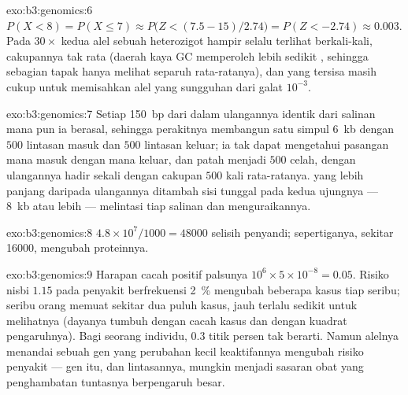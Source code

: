\begin{solution}{exo:b3:genomics:6}
$P(X < 8) = P(X \le 7) \approx P\bigl(Z < (7.5 - 15)/2.74\bigr) =
P(Z < -2.74) \approx 0.003$. Pada $30\times$ kedua alel sebuah
heterozigot hampir selalu terlihat berkali-kali, cakupannya tak rata
(daerah kaya GC memperoleh lebih sedikit , sehingga sebagian tapak
hanya melihat separuh rata-ratanya), dan  yang tersisa masih cukup untuk
memisahkan alel yang sungguhan dari galat $10^{-3}$.
\end{solution}

\begin{solution}{exo:b3:genomics:7}
Setiap  \qty{150}{bp} dari dalam ulangannya identik dari salinan mana
pun ia berasal, sehingga perakitnya membangun satu simpul \qty{6}{kb} dengan
$500$ lintasan masuk dan $500$ lintasan keluar; ia tak dapat mengetahui
pasangan mana masuk dengan mana keluar, dan  patah menjadi $500$
celah, dengan ulangannya hadir sekali dengan cakupan $500$ kali rata-ratanya.
 yang lebih panjang daripada ulangannya ditambah sisi tunggal pada
kedua ujungnya --- \qty{8}{kb} atau lebih --- melintasi tiap salinan dan
menguraikannya.
\end{solution}

\begin{solution}{exo:b3:genomics:8}
$4.8\times 10^{7}/1000 = \num{48000}$ selisih penyandi; sepertiganya,
sekitar \num{16000}, mengubah proteinnya.
\end{solution}

\begin{solution}{exo:b3:genomics:9}
Harapan cacah positif palsunya $10^{6}\times 5\times 10^{-8} = 0.05$. Risiko
nisbi $1.15$ pada penyakit berfrekuensi \qty{2}{\%} mengubah beberapa kasus
tiap seribu; seribu orang memuat sekitar dua puluh kasus, jauh terlalu sedikit
untuk melihatnya (dayanya tumbuh dengan cacah kasus dan dengan kuadrat
pengaruhnya). Bagi seorang individu, $0.3$ titik persen tak
berarti. Namun alelnya menandai sebuah gen yang perubahan kecil keaktifannya
mengubah risiko penyakit --- gen itu, dan lintasannya, mungkin menjadi
sasaran obat yang penghambatan tuntasnya berpengaruh besar.
\end{solution}

